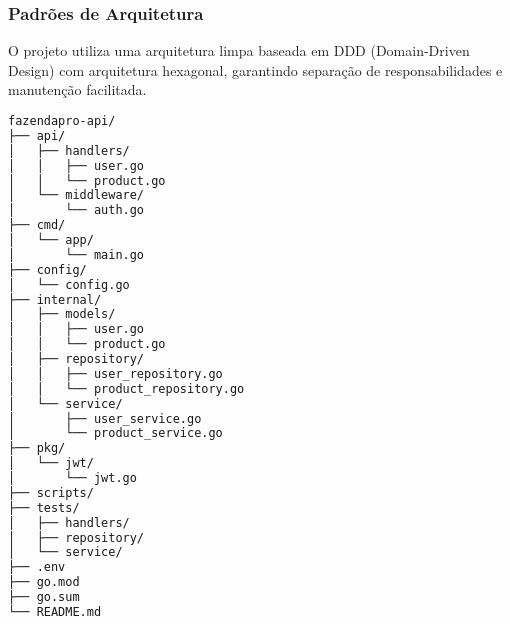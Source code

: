 \documentclass[12pt, a4paper]{article}
\begin{document}
\subsubsection{Padrões de Arquitetura}
\begin{spacing}{1.5}
O projeto utiliza uma arquitetura limpa baseada em DDD (Domain-Driven Design) com arquitetura hexagonal, garantindo separação de responsabilidades e manutenção facilitada.
\end{spacing}

\begin{lstlisting}[language=bash, caption={Estrutura de Diretórios do Projeto}]
fazendapro-api/
├── api/
│   ├── handlers/
│   │   ├── user.go
│   │   └── product.go
│   └── middleware/
│       └── auth.go
├── cmd/
│   └── app/
│       └── main.go
├── config/
│   └── config.go
├── internal/
│   ├── models/
│   │   ├── user.go
│   │   └── product.go
│   ├── repository/
│   │   ├── user_repository.go
│   │   └── product_repository.go
│   └── service/
│       ├── user_service.go
│       └── product_service.go
├── pkg/
│   └── jwt/
│       └── jwt.go
├── scripts/
├── tests/
│   ├── handlers/
│   ├── repository/
│   └── service/
├── .env
├── go.mod
├── go.sum
└── README.md
\end{lstlisting}
\end{document}
